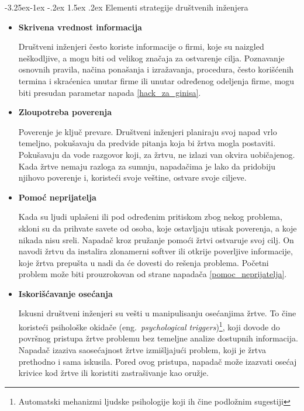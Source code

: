 \documentclass[a4paper]{article}
\makeatletter
\renewcommand\paragraph{\@startsection{paragraph}{4}{\z@}%
   {-3.25ex\@plus -1ex \@minus -.2ex}%
   {1.5ex \@plus .2ex}%
   {\normalfont\normalsize\bfseries}}
\makeatother
\begin{document}
\paragraph{Elementi strategije društvenih inženjera}
\begin{itemize}
\item \textbf{Skrivena vrednost informacija}

Društveni inženjeri često koriste informacije o firmi, koje su naizgled neškodljive, a mogu biti od velikog značaja za ostvarenje cilja. Poznavanje osnovnih pravila, načina ponašanja i izražavanja, procedura, često korišćenih termina i skraćenica unutar firme ili unutar određenog odeljenja firme, mogu biti presudan parametar napada \ref{hack_za_ginisa}.

\item \textbf{Zloupotreba poverenja}

Poverenje je ključ prevare. Društveni inženjeri planiraju svoj napad vrlo temeljno, pokušavaju da predvide pitanja koja bi žrtva mogla postaviti. Pokušavaju da vode razgovor koji, za žrtvu, ne izlazi van okvira uobičajenog. Kada žrtve nemaju razloga za sumnju, napadačima je lako da pridobiju njihovo poverenje i, koristeći svoje veštine, ostvare svoje ciljeve.

\item \textbf{Pomoć neprijatelja}

Kada su ljudi uplašeni ili pod određenim pritiskom zbog nekog problema, skloni su da prihvate savete od osoba, koje ostavljaju utisak poverenja, a koje nikada nisu sreli. Napadač kroz pružanje pomoći žrtvi ostvaruje svoj cilj. On navodi žrtvu da instalira zlonamerni softver ili otkrije poverljive informacije, koje žrtva prepušta u nadi da će dovesti do rešenja problema. Početni problem može biti prouzrokovan od strane napadača \ref{pomoc_neprijatelja}.

\item \textbf{Iskorišćavanje osećanja}

Iskusni društveni inženjeri su vešti u manipulisanju osećanjima žrtve. To čine koristeći psihološke okidače (eng.~{\em psychological triggers})\footnote{Automatski mehanizmi ljudske psihologije koji ih čine podložnim sugestiji}, koji dovode do površnog pristupa žrtve problemu bez temeljne analize dostupnih informacija. Napadač izaziva saosećajnost žrtve izmišljajući problem, koji je žrtva prethodno i sama iskusila. Pored ovog pristupa, napadač može izazvati osećaj krivice kod žrtve ili koristiti zastrašivanje kao oružje.


\end{itemize}
\end{document}
